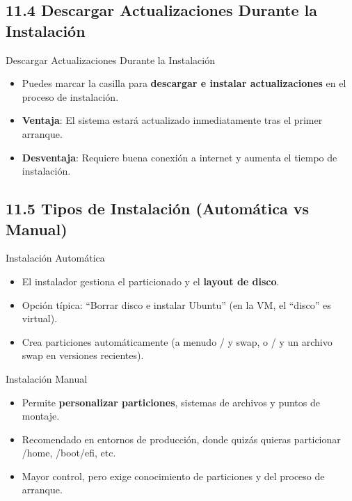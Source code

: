 \documentclass{beamer}
\begin{document}
\subsection{11.4 Descargar Actualizaciones Durante la Instalación}
\begin{frame}{Descargar Actualizaciones Durante la Instalación}
    \begin{itemize}
        \item Puedes marcar la casilla para \textbf{descargar e instalar actualizaciones} en el proceso de instalación.
        \item \textbf{Ventaja}: El sistema estará actualizado inmediatamente tras el primer arranque.
        \item \textbf{Desventaja}: Requiere buena conexión a internet y aumenta el tiempo de instalación.
    \end{itemize}
\end{frame}

\subsection{11.5 Tipos de Instalación (Automática vs Manual)}
\begin{frame}{Instalación Automática}
    \begin{itemize}
        \item El instalador gestiona el particionado y el \textbf{layout de disco}.
        \item Opción típica: “Borrar disco e instalar Ubuntu” (en la VM, el “disco” es virtual).
        \item Crea particiones automáticamente (a menudo / y swap, o / y un archivo swap en versiones recientes).
    \end{itemize}
\end{frame}

\begin{frame}{Instalación Manual}
    \begin{itemize}
        \item Permite \textbf{personalizar particiones}, sistemas de archivos y puntos de montaje.
        \item Recomendado en entornos de producción, donde quizás quieras particionar /home, /boot/efi, etc.
        \item Mayor control, pero exige conocimiento de particiones y del proceso de arranque.
    \end{itemize}
\end{frame}
\end{document}
